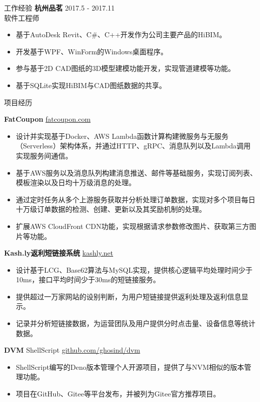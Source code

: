 \documentclass{resume} %
\begin{document}
\begin{rSection}{工作经验}
\textbf{杭州品茗} \hfill 2017.5 - 2017.11\\
软件工程师 \hfill \textit{}
\begin{itemize}
  \itemsep -3pt {}
  \item 基于AutoDesk Revit、C\#、C++开发作为公司主要产品的HiBIM。
  \item 开发基于WPF、WinForm的Windows桌面程序。
  \item 参与基于2D CAD图纸的3D模型建模功能开发，实现管道建模等功能。
  \item 基于SQLite实现HiBIM与CAD图纸数据的共享。
\end{itemize}

\end{rSection}

\begin{rSection}{项目经历}
  \vspace{-1.25em}
  
  \item \textbf{FatCoupon} {} \hfill \href{www.fatcoupon.com}{fatcoupon.com}
  \begin{itemize}
    \itemsep -3pt {}
    \item 设计并实现基于Docker、AWS Lambda函数计算构建微服务与无服务（Serverless）架构体系，并通过HTTP、gRPC、消息队列以及Lambda调用实现服务间通信。
    \item 基于AWS服务以及消息队列构建消息推送、邮件等基础服务，实现订阅列表、模板渲染以及日均十万级消息的处理。
    \item 通过定时任务从多个上游服务获取并分析处理订单数据，实现对多个项目每日十万级订单数据的检测、创建、更新以及其奖励机制的处理。
    \item 扩展AWS CloudFront CDN功能，实现根据请求参数修改图片、获取第三方图片等功能。
  \end{itemize}
  
  \item \textbf{Kash.ly返利短链接系统} {} \hfill \href{kashly.net}{kashly.net}
  \begin{itemize}
    \itemsep -3pt {}
    \item 设计基于LCG、Base62算法与MySQL实现，提供核心逻辑平均处理时间少于10ms，接口平均时间少于30ms的短链接服务。
    \item 提供超过一万家网站的设别判断，为用户短链接提供返利处理及返利信息显示。
    \item 记录并分析短链接数据，为运营团队及用户提供分时点击量、设备信息等统计数据。
  \end{itemize}
  
  \item \textbf{DVM} {ShellScript} \hfill \href{github.com/ghosind/dvm}{github.com/ghosind/dvm}
  \begin{itemize}
    \itemsep -3pt {}
    \item ShellScript编写的Deno版本管理个人开源项目，提供了与NVM相似的版本管理功能。
    \item 项目在GitHub、Gitee等平台发布，并被列为Gitee官方推荐项目。
  \end{itemize}
  
\end{rSection}
\end{document}
